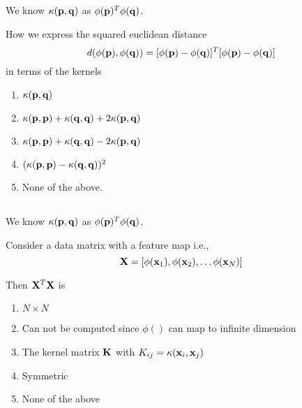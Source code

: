 \begin{frame}
\section{}
We know $\kappa({\bf p}, {\bf q})$ as $\phi({\bf p})^T\phi({\bf q})$.

How we express the squared euclidean distance
\[ d(\phi({\bf p}),\phi({\bf q})) = [\phi({\bf p})-\phi({\bf q})]^T[\phi({\bf p})-\phi({\bf q})] \] in terms of the kernels

\begin{enumerate}[label=(\Alph*)]
\item $\kappa({\bf p}, {\bf q})$
\item $\kappa({\bf p}, {\bf p})+\kappa({\bf q}, {\bf q})  + 2 \kappa({\bf p}, {\bf q})$
\item $\kappa({\bf p}, {\bf p})+\kappa({\bf q}, {\bf q})  - 2 \kappa({\bf p}, {\bf q})$   %
\item $(\kappa({\bf p}, {\bf p})-\kappa({\bf q}, {\bf q}))^2$
\item None of the above.  %
\end{enumerate}
\end{frame}

\begin{frame}
\section{}
We know $\kappa({\bf p}, {\bf q})$ as $\phi({\bf p})^T\phi({\bf q})$.

Consider a data matrix  with a feature map i.e.,
\[ {\bf X} = [\phi({\bf x}_1), \phi({\bf x}_2), \ldots \phi({\bf x}_N)] \]

Then ${\bf X}^T{\bf X}$ is

\begin{enumerate}[label=(\Alph*)]
\item $N\times N$   %
\item Can not be computed since $\phi()$ can map to infinite dimension
\item The kernel matrix ${\bf K}$ with $K_{ij} = \kappa({\bf x}_i, {\bf x}_j)$    %
\item Symmetric   %
\item None of the above     %
\end{enumerate}
\end{frame}

